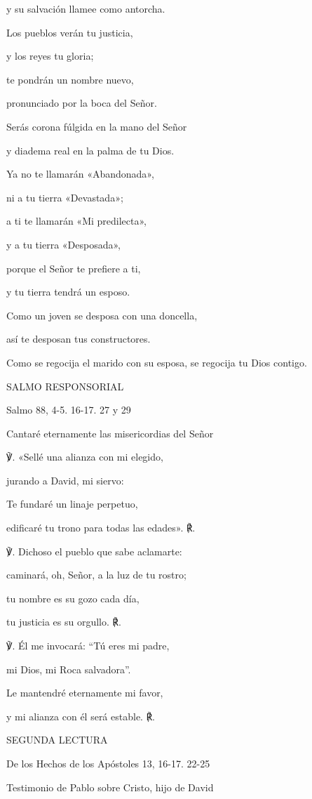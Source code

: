 \documentclass[]{article}
\begin{document}
y su salvación llamee como antorcha.

Los pueblos verán tu justicia,

y los reyes tu gloria;

te pondrán un nombre nuevo,

pronunciado por la boca del Señor.

Serás corona fúlgida en la mano del Señor

y diadema real en la palma de tu Dios.

Ya no te llamarán «Abandonada»,

ni a tu tierra «Devastada»;

a ti te llamarán «Mi predilecta»,

y a tu tierra «Desposada»,

porque el Señor te prefiere a ti,

y tu tierra tendrá un esposo.

Como un joven se desposa con una doncella,

así te desposan tus constructores.

Como se regocija el marido con su esposa, se regocija tu Dios contigo.

SALMO RESPONSORIAL

Salmo 88, 4-5. 16-17. 27 y 29

Cantaré eternamente las misericordias del Señor

℣. «Sellé una alianza con mi elegido,

jurando a David, mi siervo:

Te fundaré un linaje perpetuo,

edificaré tu trono para todas las edades». ℟.

℣. Dichoso el pueblo que sabe aclamarte:

caminará, oh, Señor, a la luz de tu rostro;

tu nombre es su gozo cada día,

tu justicia es su orgullo. ℟.

℣. Él me invocará: ``Tú eres mi padre,

mi Dios, mi Roca salvadora''.

Le mantendré eternamente mi favor,

y mi alianza con él será estable. ℟.

SEGUNDA LECTURA

De los Hechos de los Apóstoles 13, 16-17. 22-25

Testimonio de Pablo sobre Cristo, hijo de David
\end{document}
